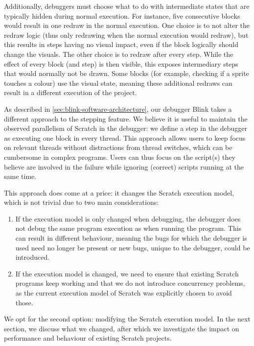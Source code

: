 \documentclass[../main]{subfiles}
\begin{document}
Additionally, debuggers must choose what to do with intermediate states that are typically hidden during normal execution.
For instance, five consecutive blocks would result in one redraw in the normal execution.
One choice is to not alter the redraw logic (thus only redrawing when the normal execution would redraw), but this results in steps having no visual impact, even if the block logically should change the visuals.
The other choice is to redraw after every step.
While the effect of every block (and step) is then visible, this exposes intermediary steps that would normally not be drawn.
Some blocks (for example, checking if a sprite touches a colour) use the visual state, meaning these additional redraws can result in a different execution of the project.

As described in \cref{sec:blink-software-architecture}, our debugger Blink takes a different approach to the stepping feature.
We believe it is useful to maintain the observed parallelism of Scratch in the debugger: we define a step in the debugger as executing one block in every thread.
This approach allows users to keep focus on relevant threads without distractions from thread switches, which can be cumbersome in complex programs.
Users can thus focus on the script(s) they believe are involved in the failure while ignoring (correct) scripts running at the same time.

This approach does come at a price: it changes the Scratch execution model, which is not trivial due to two main considerations:

\begin{enumerate}
    \item If the execution model is only changed when debugging, the debugger does not debug the same program execution as when running the program.
        This can result in different behaviour, meaning the bugs for which the debugger is used need no longer be present or new bugs, unique to the debugger, could be introduced.
    \item If the execution model is changed, we need to ensure that existing Scratch programs keep working and that we do not introduce concurrency problems, as the current execution model of Scratch was explicitly chosen to avoid those.
\end{enumerate}

We opt for the second option: modifying the Scratch execution model.
In the next section, we discuss what we changed, after which we investigate the impact on performance and behaviour of existing Scratch projects.
\end{document}
